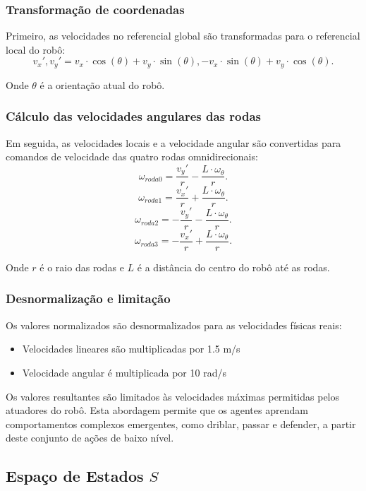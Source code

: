 \subsubsection{Transformação de coordenadas}

Primeiro, as velocidades no referencial global são transformadas para o referencial local do robô:
$$v_x', v_y' = v_x \cdot \cos(\theta) + v_y \cdot \sin(\theta), -v_x \cdot \sin(\theta) + v_y \cdot \cos(\theta).$$

Onde $\theta$ é a orientação atual do robô.

\subsubsection{Cálculo das velocidades angulares das rodas}

Em seguida, as velocidades locais e a velocidade angular são convertidas para comandos de velocidade das quatro rodas omnidirecionais:
$$\omega_{roda0} = \frac{v_y'}{r} - \frac{L \cdot \omega_{\theta}}{r}.$$
$$\omega_{roda1} = \frac{v_x'}{r} + \frac{L \cdot \omega_{\theta}}{r}.$$
$$\omega_{roda2} = -\frac{v_y'}{r} - \frac{L \cdot \omega_{\theta}}{r}.$$
$$\omega_{roda3} = -\frac{v_x'}{r} + \frac{L \cdot \omega_{\theta}}{r}.$$

Onde $r$ é o raio das rodas e $L$ é a distância do centro do robô até as rodas.

\subsubsection{Desnormalização e limitação}

Os valores normalizados são desnormalizados para as velocidades físicas reais:
\begin{itemize}
    \item Velocidades lineares são multiplicadas por 1.5 m/s
    \item Velocidade angular é multiplicada por 10 rad/s
\end{itemize}

Os valores resultantes são limitados às velocidades máximas permitidas pelos atuadores do robô. Esta abordagem permite que os agentes aprendam comportamentos complexos emergentes, como driblar, passar e defender, a partir deste conjunto de ações de baixo nível.

\subsection{Espaço de Estados $S$}

